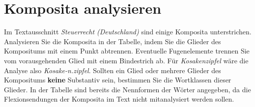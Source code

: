 \section{Komposita analysieren}\label{sec:analyse}

Im Textausschnitt \textit{Steuerrecht (Deutschland)} sind einige Komposita unterstrichen.
Analysieren Sie die Komposita in der Tabelle, indem Sie die Glieder des Kompositums mit einem Punkt abtrennen.
Eventuelle Fugenelemente trennen Sie vom vorausgehenden Glied mit einem Bindestrich ab.
Für \textit{Kosakenzipfel} wäre die Analyse also \textit{Kosake-n.zipfel}.
Sollten ein Glied oder mehrere Glieder des Kompositums \textbf{keine} Substantiv sein, bestimmen Sie die Wortklassen dieser Glieder.
In der Tabelle sind bereits die Nennformen der Wörter angegeben, da die Flexionsendungen der Komposita im Text nicht mitanalysiert werden sollen.

\Zeile

